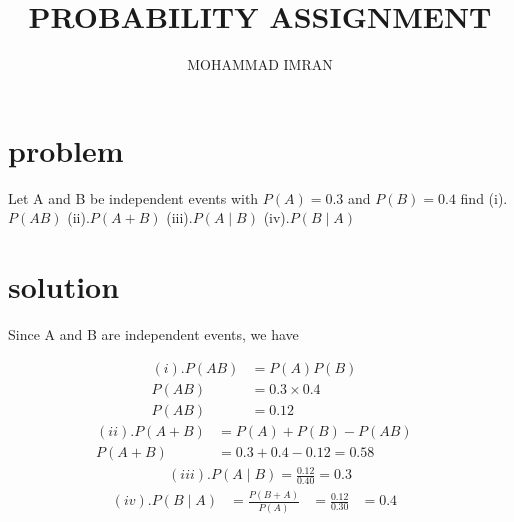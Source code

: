 \documentclass[journal,12pt,twocolumn]{article}
\title{PROBABILITY ASSIGNMENT}
\author{MOHAMMAD IMRAN}
\begin{document}
\maketitle
\bigskip

\section{problem }

Let A and B be independent events with $P(A)=0.3$ and $P(B)=0.4$ find 
(i).$P(AB)$
     (ii).$P(A+B)$ 
(iii).$P(A \mid B)$   
       (iv).$P(B \mid A)$
\section{solution }  


Since A and B are independent events, we have 

\begin{align}
(i).P(AB)&=P(A) P(B)&\\
P(AB)&=0.3 \times 0.4&\\
P(AB)&=0.12&\label{1}
\end{align}
\begin{align}
(ii). P(A+B)&=P(A)+P(B)-P(AB)&\\
P(A+B)&=0.3+0.4-0.12=0.58&\label{2}
\end{align}
\begin{align}
(iii).P(A \mid B)=\frac{0.12}{0.40}=0.3\label{3}
\end{align}
\begin{align}
(iv).P(B \mid A)&=\frac{P(B+A)}{P(A)}&=\frac{0.12}{0.30}&=0.4&
\end{align}
 
\end{document}
